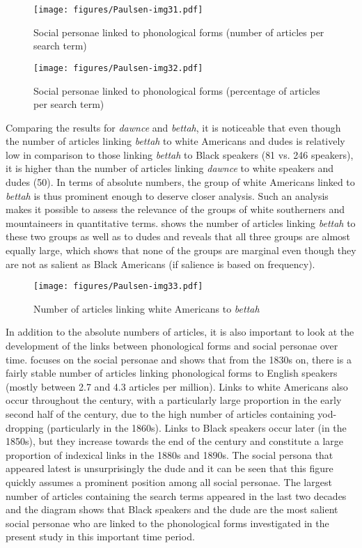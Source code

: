 \begin{figure}
\texttt{[image: figures/Paulsen-img31.pdf]}
\caption{
Social personae linked to phonological forms (number of articles per search term)
}
\label{fig:key:31}
\end{figure}
\begin{figure}
\texttt{[image: figures/Paulsen-img32.pdf]}
\caption{
Social personae linked to phonological forms (percentage of articles per search term)
}
\label{fig:key:32}
\end{figure}

Comparing the results for \emph{dawnce} and \emph{bettah}, it is noticeable that even though the number of articles linking \emph{bettah} to white Americans and dudes is relatively low in comparison to those linking \emph{bettah} to Black speakers (81 vs. 246 speakers), it is higher than the number of articles linking \emph{dawnce} to white speakers and dudes (50). In terms of absolute numbers, the group of white Americans linked to \emph{bettah} is thus prominent enough to deserve closer analysis. Such an analysis makes it possible to assess the relevance of the groups of white southerners and mountaineers in quantitative terms.  shows the number of articles linking \emph{bettah} to these two groups as well as to dudes and reveals that all three groups are almost equally large, which shows that none of the groups are marginal even though they are not as salient as Black Americans (if salience is based on frequency).


\begin{figure}
\texttt{[image: figures/Paulsen-img33.pdf]}
\caption{
Number of articles linking white Americans to \emph{bettah}
}
\label{fig:key:33}
\end{figure}

In addition to the absolute numbers of articles, it is also important to look at the development of the links between phonological forms and social personae over time.  focuses on the social personae and shows that from the 1830s on, there is a fairly stable number of articles linking phonological forms to English speakers (mostly between 2.7 and 4.3 articles per million). Links to white Americans also occur throughout the century, with a particularly large proportion in the early second half of the century, due to the high number of articles containing yod-dropping (particularly in the 1860s). Links to Black speakers occur later (in the 1850s), but they increase towards the end of the century and constitute a large proportion of indexical links in the 1880s and 1890s. The social persona that appeared latest is unsurprisingly the dude and it can be seen that this figure quickly assumes a prominent position among all social personae. The largest number of articles containing the search terms appeared in the last two decades and the diagram shows that Black speakers and the dude are the most salient social personae who are linked to the phonological forms investigated in the present study in this important time period.



